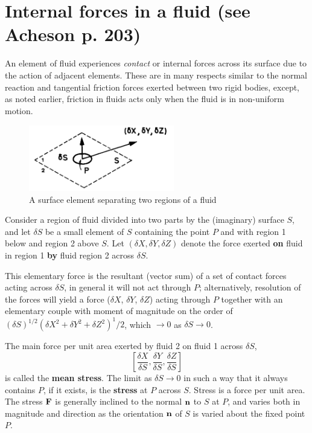 \documentclass[10pt]{report}
\begin{document}
\section{Internal forces in a fluid (see Acheson p. 203)}
An element of fluid experiences \textit{contact} or internal forces across its surface due
to the action of adjacent elements. These are in many respects similar to
the normal reaction and tangential friction forces exerted between two rigid
bodies, except, as noted earlier, friction in fluids acts only when the
fluid is in non-uniform motion.

\begin{figure}
\centerline{\includegraphics[width=2.5in]{Section22.pdf}}
\label{fig1.2}
\caption{ A surface element separating two regions of a fluid }
\end{figure}

Consider a region of fluid divided into two parts by the (imaginary) surface
$S$, and let $\delta S$ be a small element of $S$ containing the point $P$ and
with region 1 below and region 2 above $S$. Let $(\delta X, \delta Y,
\delta Z)$ denote the force exerted \textbf{on} fluid in region 1
\textbf{by} fluid region 2 across $\delta S$.

This elementary force is the resultant (vector sum) of a set of contact
forces acting across $\delta S$, in general it will not act through $P$;
alternatively, resolution of the forces will yield a force ($\delta X$,
$\delta Y$, $\delta Z$) acting through $P$ together with an elementary couple
with moment of magnitude on the order of $(\delta S)^{1/2}(\delta
X^2+\delta Y^2+\delta Z^2)^1/2$, which $\to  0$ as $\delta S \to 0$.

The main force per unit area exerted by fluid 2 on fluid 1 across $\delta
S$,
\[
\left[ {\frac{\delta X}{\delta S},\frac{\delta Y}{\delta
S},\frac{\delta Z}{\delta S}} \right]
\]
is called the \textbf{mean stress}. The limit as $\delta S \to  0$ in such
a way that it always contains $P$, if it exists, is the \textbf{stress} at $P$
across $S$. Stress is a force per unit area. The stress ${\bf F}$ is
generally inclined to the normal ${\bf n}$ to $S$ at $P$, and varies both in
magnitude and direction as the orientation ${\bf n}$ of $S$ is varied about
the fixed point $P$.
\end{document}
